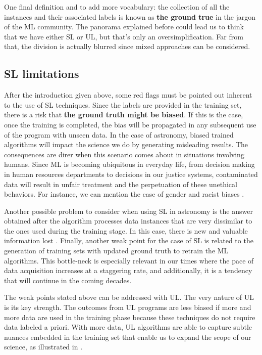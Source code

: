 One final definition and to add more vocabulary: the collection of all the instances and their associated labels is known as \textbf{the ground true} in the jargon of the ML community. The panorama explained before could lead us to think that we have either SL or UL, but that's only an oversimplification. Far from that, the division is actually blurred since mixed approaches can be considered.
 
\subsection{SL limitations}

After the introduction given above, some red flags must be pointed out inherent to the use of SL techniques. Since the labels are provided in the training set, there is a risk that \textbf{the ground truth might be biased}. If this is the case, once the training is completed, the bias will be propagated in any subsequent use of the program with unseen data. In the case of astronomy, biased trained algorithms will impact the science we do by generating misleading results. The consequences are direr when this scenario comes about in situations involving humans. Since ML is becoming ubiquitous in everyday life, from decision making in human resources departments to decisions in our justice systems, contaminated data will result in unfair treatment and the perpetuation of these unethical behaviors. For instance, we can mention the case of gender and racist biases \cite{Oneil2016}.

Another possible problem to consider when using SL in astronomy is the answer obtained after the algorithm processes data instances that are very dissimilar to the ones used during the training stage. In this case, there is new and valuable information lost \cite{Baron2017, Reis2019}. Finally, another weak point for the case of SL is related to the generation of training sets with updated ground truth to retrain the ML algorithms. This bottle-neck is especially relevant in our times where the pace of data acquisition increases at a staggering rate, and additionally, it is a tendency that will continue in the coming decades.

The weak points stated above can be addressed with UL. The very nature of UL is its key strength. The outcomes from UL programs are less biased if more and more data are used in the training phase because these techniques do not require data labeled a priori. With more data, UL algorithms are able to capture subtle nuances embedded in the training set that enable us to expand the scope of our science, as illustrated in \cite{Martin2019}. 

